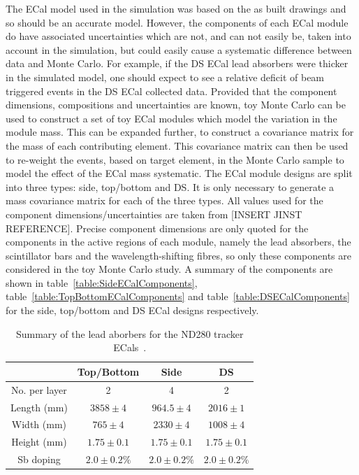 The ECal model used in the simulation was based on the as built drawings and so should be an accurate model.  However, the components of each ECal module do have associated uncertainties which are not, and can not easily be, taken into account in the simulation, but could easily cause a systematic difference between data and Monte Carlo.  For example, if the DS ECal lead absorbers were thicker in the simulated model, one should expect to see a relative deficit of beam triggered events in the DS ECal collected data.  Provided that the component dimensions, compositions and uncertainties are known, toy Monte Carlo can be used to construct a set of toy ECal modules which model the variation in the module mass.  This can be expanded further, to construct a covariance matrix for the mass of each contributing element.  This covariance matrix can then be used to re-weight the events, based on target element, in the Monte Carlo sample to model the effect of the ECal mass systematic.  The ECal module designs are split into three types: side, top/bottom and DS.  It is only necessary to generate a mass covariance matrix for each of the three types.  All values used for the component dimensions/uncertainties are taken from [INSERT JINST REFERENCE].  Precise component dimensions are only quoted for the components in the active regions of each module, namely the lead absorbers, the scintillator bars and the wavelength-shifting fibres, so only these components are considered in the toy Monte Carlo study.  A summary of the components are shown in table~\ref{table:SideECalComponents}, table~\ref{table:TopBottomECalComponents} and table~\ref{table:DSECalComponents} for the side, top/bottom and DS ECal designs respectively.
\begin{table}
  \begin{tabular}{ c c c c }
     & Top/Bottom & Side & DS \\ \hline \hline
  No. per layer & 2 & 4 & 2 \\
  Length (mm) & $3858\pm4$ & $964.5\pm4$ & $2016\pm1$ \\
  Width (mm) & $765\pm4$ & $2330\pm4$ & $1008\pm4$ \\
  Height (mm) & $1.75\pm0.1$ & $1.75\pm0.1$ & $1.75\pm0.1$ \\
  Sb doping & $2.0\pm0.2\%$ & $2.0\pm0.2\%$ & $2.0\pm0.2\%$ \\
  \end{tabular}
  \caption{Summary of the lead aborbers for the ND280 tracker ECals~\cite{1748-0221-8-10-P10019}.}
  \label{table:LeadAbsorberDimensions}
\end{table}
